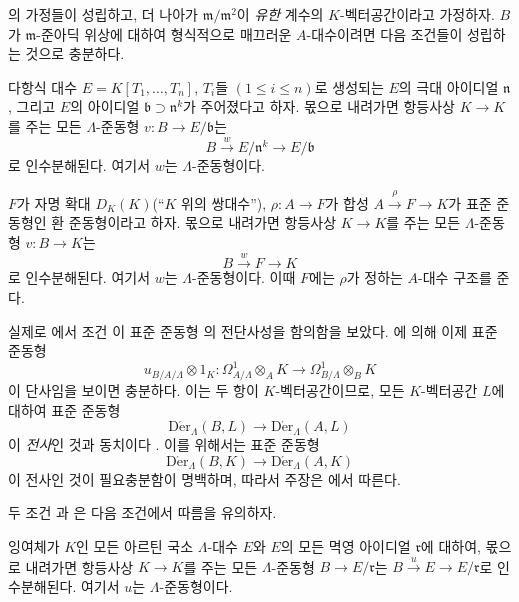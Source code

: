 \begin{remark}[22.1.3]
\label{0.22.1.3-ko}
의 가정들이 성립하고, 더 나아가
$\mathfrak m/\mathfrak m^2$이 \emph{유한} 계수의 $K$-벡터공간이라고
가정하자. $B$가 $\mathfrak m$-준아딕 위상에 대하여 형식적으로
매끄러운 $A$-대수이려면 다음 조건들이 성립하는 것으로 충분하다.

\begin{env}[22.1.3.1]
\label{0.22.1.3.1-ko}
다항식 대수 $E=K[T_1,\ldots,T_n]$, $T_i$들 $(1\leqslant i\leqslant n)$로
생성되는 $E$의 극대 아이디얼 $\mathfrak n$, 그리고 $E$의 아이디얼
$\mathfrak b\supset\mathfrak n^k$가 주어졌다고 하자. 몫으로 내려가면
항등사상 $K\to K$를 주는 모든 $\Lambda$-준동형
$v:B\to E/\mathfrak b$는
\[
  B\xrightarrow{w}E/\mathfrak n^k\longrightarrow E/\mathfrak b
\]
로 인수분해된다. 여기서 $w$는 $\Lambda$-준동형이다.
\end{env}

\begin{env}[22.1.3.2]
\label{0.22.1.3.2-ko}
$F$가 자명 확대 $D_K(K)$(``$K$ 위의 쌍대수''),
$\rho:A\to F$가 합성 $A\xrightarrow{\rho}F\to K$가 표준 준동형인 환
준동형이라고 하자. 몫으로 내려가면 항등사상 $K\to K$를 주는 모든
$\Lambda$-준동형 $v:B\to K$는
\[
  B\xrightarrow{w}F\longrightarrow K
\]
로 인수분해된다. 여기서 $w$는 $\Lambda$-준동형이다. 이때 $F$에는
$\rho$가 정하는 $A$-대수 구조를 준다.
\end{env}

실제로 에서 조건 이 표준
준동형 의 전단사성을 함의함을 보았다.
에 의해 이제 표준 준동형
\[
  u_{B/A/\Lambda}\otimes1_K:
  \Omega^1_{A/\Lambda}\otimes_AK
  \longrightarrow\Omega^1_{B/\Lambda}\otimes_BK
\]
이 단사임을 보이면 충분하다. 이는 두 항이 $K$-벡터공간이므로, 모든
$K$-벡터공간 $L$에 대하여 표준 준동형
\[
  \operatorname{D\acute{e}r}_\Lambda(B,L)
  \longrightarrow\operatorname{D\acute{e}r}_\Lambda(A,L)
\]
이 \emph{전사}인 것과 동치이다 . 이를 위해서는 표준
준동형
\[
  \operatorname{D\acute{e}r}_\Lambda(B,K)
  \longrightarrow\operatorname{D\acute{e}r}_\Lambda(A,K)
\]
이 전사인 것이 필요충분함이 명백하며, 따라서 주장은
에서 따른다.

두 조건 과 은 다음 조건에서
따름을 유의하자.

\begin{env}[22.1.3.3]
\label{0.22.1.3.3-ko}
잉여체가 $K$인 모든 아르틴 국소 $\Lambda$-대수 $E$와 $E$의 모든
멱영 아이디얼 $\mathfrak r$에 대하여, 몫으로 내려가면 항등사상
$K\to K$를 주는 모든 $\Lambda$-준동형 $B\to E/\mathfrak r$는
$B\xrightarrow{u}E\to E/\mathfrak r$로 인수분해된다. 여기서 $u$는
$\Lambda$-준동형이다.
\end{env}
\end{remark}

